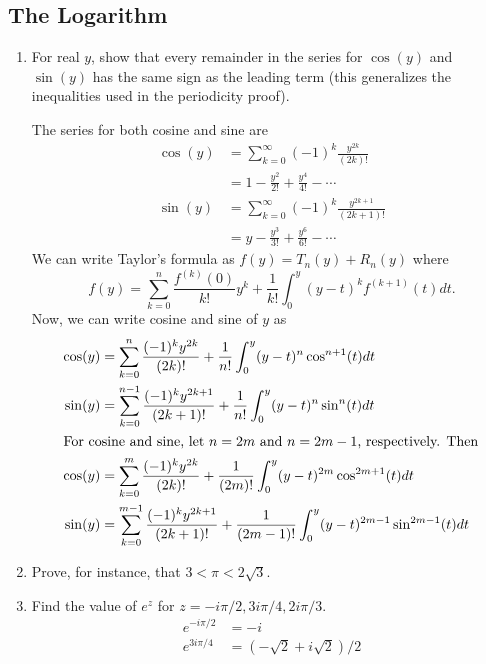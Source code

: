 \subsection{The Logarithm}

\begin{enumerate}
\item
  For real \(y\), show that every remainder in the series for \(\cos(y)\) and
  \(\sin(y)\) has the same sign as the leading term (this generalizes the
  inequalities used in the periodicity proof).
  \par\smallskip
  The series for both cosine and sine are
  \begin{align*}
    \cos(y) & = \sum_{k = 0}^{\infty}(-1)^k\frac{y^{2k}}{(2k)!}\\
            & = 1 - \frac{y^2}{2!} + \frac{y^4}{4!} - \cdots\\
    \sin(y) & = \sum_{k = 0}^{\infty}(-1)^k\frac{y^{2k + 1}}{(2k + 1)!}\\
            & = y - \frac{y^3}{3!} + \frac{y^6}{6!} - \cdots
  \end{align*}
  We can write Taylor's formula as \(f(y) = T_n(y) + R_n(y)\) where
  \[
  f(y) = \sum_{k = 0}^n\frac{f^{(k)}(0)}{k!}y^k + \frac{1}{k!}\int_0^y(y - t)^k
  f^{(k + 1)}(t)dt.
  \]
  Now, we can write cosine and sine of \(y\) as
  \begin{align*}
    \cos(y) & = \sum_{k = 0}^n\frac{(-1)^ky^{2k}}{(2k)!} + \frac{1}{n!}
              \int_0^y(y - t)^n\cos^{n + 1}(t)dt\\
    \sin(y) & = \sum_{k = 0}^{n - 1}\frac{(-1)^ky^{2k + 1}}{(2k + 1)!} +
              \frac{1}{n!}\int_0^y(y - t)^n\sin^n(t)dt\\
    \intertext{For cosine and sine, let \(n = 2m\) and \(n = 2m - 1\),
    respectively.
    Then}
    \cos(y) & = \sum_{k = 0}^m\frac{(-1)^ky^{2k}}{(2k)!} + \frac{1}{(2m)!}
              \int_0^y(y - t)^{2m}\cos^{2m + 1}(t)dt\\
    \sin(y) & = \sum_{k = 0}^{m - 1}\frac{(-1)^ky^{2k + 1}}{(2k + 1)!} +
              \frac{1}{(2m - 1)!}\int_0^y(y - t)^{2m - 1}\sin^{2m - 1}(t)dt
  \end{align*}
\item
  Prove, for instance, that \(3 < \pi < 2\sqrt{3}\).
\item
  Find the value of \(e^z\) for \(z = -i\pi/2,3i\pi/4,2i\pi/3\).
  \begin{align*}
    e^{-i\pi/2} & = -i\\
    e^{3i\pi/4} & = (-\sqrt{2} + i\sqrt{2})/2\\

\end{align*}
\end{enumerate}

